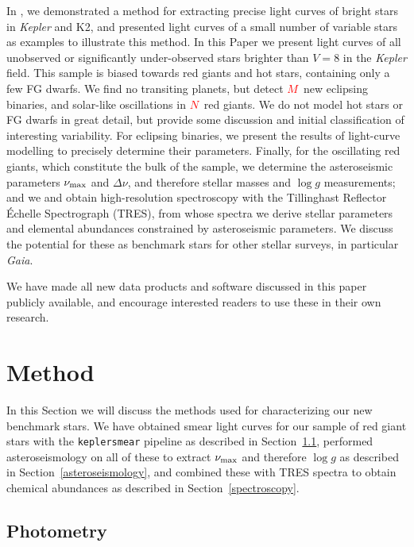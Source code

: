 \documentclass[a4paper,fleqn,usenatbib]{mnras}
\newcommand{\numax}{\mbox{$\nu_{\rm max}$}\xspace}
\newcommand{\Dnu}{\mbox{$\Delta \nu$}\xspace}
\newcommand{\logg}{\mbox{$\log g$}\xspace}
\newcommand{\kepler}{\emph{Kepler}\xspace}
\newcommand{\gaia}{\emph{Gaia}\xspace}
\begin{document}
In \citet{smear}, we demonstrated a method for extracting precise light curves of bright stars in \kepler and K2, and presented light curves of a small number of variable stars as examples to illustrate this method. In this Paper we present light curves of all unobserved or significantly under-observed stars brighter than $V=8$ in the \kepler field. This sample is biased towards red giants and hot stars, containing only a few FG dwarfs. We find no transiting planets, but detect \textcolor{red}{$M$}~new eclipsing binaries, and solar-like oscillations in \textcolor{red}{$N$}~red giants. We do not model hot stars or FG dwarfs in great detail, but provide some discussion and initial classification of interesting variability. For eclipsing binaries, we present the results of light-curve modelling to precisely determine their parameters. Finally, for the oscillating red giants, which constitute the bulk of the sample, we determine the asteroseismic parameters \numax and \Dnu, and therefore stellar masses and \logg measurements; and we and obtain high-resolution spectroscopy with the Tillinghast Reflector \'{E}chelle Spectrograph (TRES), from whose spectra we derive stellar parameters and elemental abundances constrained by asteroseismic parameters. We discuss the potential for these as benchmark stars for other stellar surveys, in particular \gaia. 

We have made all new data products and software discussed in this paper publicly available, and encourage interested readers to use these in their own research.   

\section{Method}
\label{method}

In this Section we will discuss the methods used for characterizing our new benchmark stars. We have obtained smear light curves for our sample of red giant stars with the \texttt{keplersmear} pipeline as described in Section~\ref{photometry}, performed asteroseismology on all of these to extract \numax and therefore \logg as described in Section~\ref{asteroseismology}, and combined these with TRES spectra to obtain chemical abundances as described in Section~\ref{spectroscopy}. 

\subsection{Photometry}
\label{photometry}
\end{document}
